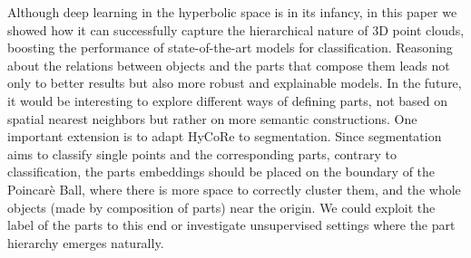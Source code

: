 \documentclass{article}
\begin{document}
Although deep learning in the hyperbolic space is in its infancy, in this paper we showed how it can successfully capture the hierarchical nature of 3D point clouds, boosting the performance of state-of-the-art models for classification. Reasoning about the relations between objects and the parts that compose them leads not only to better results but also more robust and explainable models. In the future, it would be interesting to explore different ways of defining parts, not based on spatial nearest neighbors but rather on more semantic constructions. One important extension is to adapt HyCoRe to segmentation. Since segmentation aims to classify single points and the corresponding parts, contrary to classification, the parts embeddings should be placed on the boundary of the Poincarè Ball, where there is more space to correctly cluster them, and the whole objects (made by composition of parts) near the origin. We could exploit the label of the parts to this end or investigate unsupervised settings where the part hierarchy emerges naturally.
\end{document}
